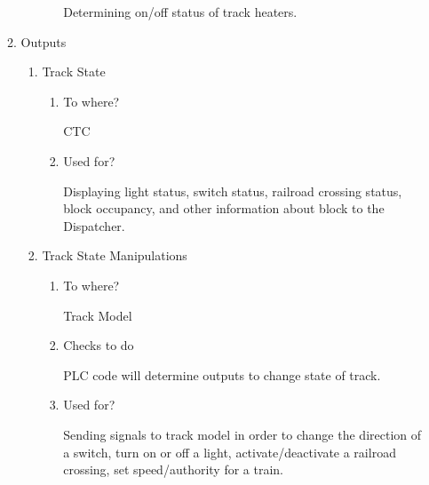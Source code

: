 \documentclass[11pt]{article}
\begin{document}
\begin{enumerate}
\begin{enumerate}
\begin{enumerate}
\begin{enumerate}
Determining on/off status of track heaters.
\end{enumerate}
\end{enumerate}
\item Outputs
\label{sec-3-1-2-3-2}
\begin{enumerate}
\item Track State
\label{sec-3-1-2-3-2-1}
\begin{enumerate}
\item To where?
\label{sec-3-1-2-3-2-1-1}

CTC
\item Used for?
\label{sec-3-1-2-3-2-1-2}

Displaying light status, switch status, railroad crossing status, block occupancy, and other information about block to the Dispatcher.
\end{enumerate}
\item Track State Manipulations
\label{sec-3-1-2-3-2-2}
\begin{enumerate}
\item To where?
\label{sec-3-1-2-3-2-2-1}

Track Model
\item Checks to do
\label{sec-3-1-2-3-2-2-2}

PLC code will determine outputs to change state of track.
\item Used for?
\label{sec-3-1-2-3-2-2-3}

Sending signals to track model in order to change the direction of a switch, turn on or off a light, activate/deactivate a railroad crossing, set speed/authority for a train.
\end{enumerate}
\end{enumerate}
\end{enumerate}
\end{enumerate}
\end{document}
